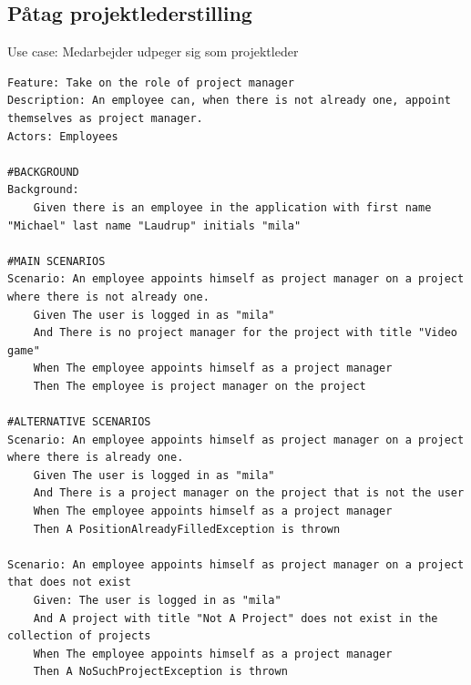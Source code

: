 \subsection{Påtag projektlederstilling} 
\begin{listing}[H]
    \centering
    \caption{Use case: Medarbejder udpeger sig som projektleder} \label{lst:usecase_bliv_projektleder}
    \begin{verbatim}  
Feature: Take on the role of project manager
Description: An employee can, when there is not already one, appoint themselves as project manager.
Actors: Employees

#BACKGROUND
Background:
    Given there is an employee in the application with first name "Michael" last name "Laudrup" initials "mila"

#MAIN SCENARIOS
Scenario: An employee appoints himself as project manager on a project where there is not already one.
    Given The user is logged in as "mila"
    And There is no project manager for the project with title "Video game"
    When The employee appoints himself as a project manager
    Then The employee is project manager on the project

#ALTERNATIVE SCENARIOS
Scenario: An employee appoints himself as project manager on a project where there is already one.
    Given The user is logged in as "mila"
    And There is a project manager on the project that is not the user
    When The employee appoints himself as a project manager
    Then A PositionAlreadyFilledException is thrown

Scenario: An employee appoints himself as project manager on a project that does not exist
    Given: The user is logged in as "mila"
    And A project with title "Not A Project" does not exist in the collection of projects
    When The employee appoints himself as a project manager
    Then A NoSuchProjectException is thrown
    \end{verbatim}
\end{listing}


